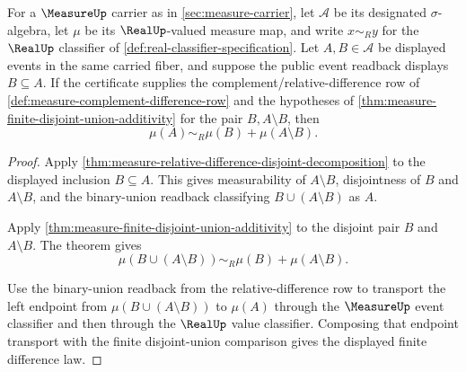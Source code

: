 \begin{theorem}
\label{thm:measure-relative-difference-additivity}
For a $\MeasureUp$ carrier as in \autoref{sec:measure-carrier}, let
$\mathcal{A}$ be its designated $\sigma$-algebra, let $\mu$ be its
$\RealUp$-valued measure map, and write $x\sim_R y$ for the $\RealUp$
classifier of \autoref{def:real-classifier-specification}. Let
$A,B\in\mathcal{A}$ be displayed events in the same carried fiber, and suppose
the public event readback displays $B\subseteq A$. If the certificate supplies
the complement/relative-difference row of
\autoref{def:measure-complement-difference-row} and the hypotheses of
\autoref{thm:measure-finite-disjoint-union-additivity} for the pair
$B,A\setminus B$, then
$$
\mu(A)\sim_R\mu(B)+\mu(A\setminus B).
$$
\end{theorem}
\begin{proof}
Apply
\autoref{thm:measure-relative-difference-disjoint-decomposition} to the
displayed inclusion $B\subseteq A$. This gives measurability of
$A\setminus B$, disjointness of $B$ and $A\setminus B$, and the binary-union
readback classifying $B\cup(A\setminus B)$ as $A$.

Apply \autoref{thm:measure-finite-disjoint-union-additivity} to the disjoint
pair $B$ and $A\setminus B$. The theorem gives
$$
\mu(B\cup(A\setminus B))\sim_R\mu(B)+\mu(A\setminus B).
$$

Use the binary-union readback from the relative-difference row to transport the
left endpoint from $\mu(B\cup(A\setminus B))$ to $\mu(A)$ through the
$\MeasureUp$ event classifier and then through the $\RealUp$ value classifier.
Composing that endpoint transport with the finite disjoint-union comparison
gives the displayed finite difference law.
\end{proof}

